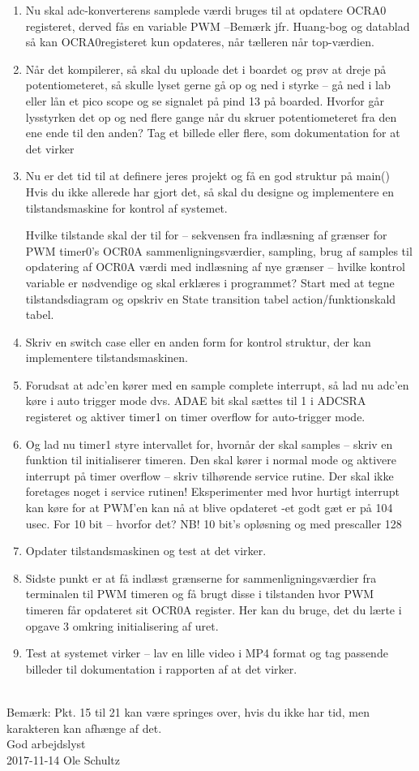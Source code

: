 \documentclass[a4paper,11pt]{article}
\theoremstyle{mytheor}
\begin{document}
\begin{enumerate}
\item	Nu skal adc-konverterens samplede værdi bruges til at opdatere OCRA0 registeret, derved fås en variable PWM –Bemærk jfr. Huang-bog og datablad så kan OCRA0registeret kun opdateres, når tælleren når top-værdien. 
\item 	Når det kompilerer, så skal du uploade det i boardet og prøv at dreje på potentiometeret, så skulle lyset gerne gå op og ned i styrke – gå ned i lab eller lån et pico scope og se signalet på pind 13 på boarded. Hvorfor går lysstyrken det op og ned flere gange når du skruer potentiometeret fra den ene ende til den anden? Tag et billede eller flere, som dokumentation for at det virker

\item Nu er det tid til at definere jeres projekt og få en god struktur på main()
Hvis du ikke allerede har gjort det, så skal du designe og implementere en tilstandsmaskine for kontrol af systemet. \par Hvilke tilstande skal der til for – sekvensen fra indlæsning af grænser for PWM timer0’s 
OCR0A sammenligningsværdier, sampling, brug af samples til opdatering af OCR0A værdi med indlæsning af nye grænser – hvilke kontrol variable er nødvendige og skal erklæres i programmet? Start med at tegne tilstandsdiagram og opskriv en State transition tabel action/funktionskald tabel. 
\item 	Skriv en switch case eller en anden form for kontrol struktur, der kan implementere tilstandsmaskinen. 

\item 	Forudsat at adc’en kører med en sample complete interrupt, så lad nu adc’en køre i auto trigger mode dvs. ADAE bit skal sættes til 1 i ADCSRA registeret og aktiver timer1 on timer overflow for auto-trigger mode. 

\item 	Og lad nu timer1 styre intervallet for, hvornår der skal samples – skriv en funktion til initialiserer timeren. Den skal kører i normal mode og aktivere interrupt på timer overflow – skriv tilhørende service rutine. Der skal ikke foretages noget i service rutinen! Eksperimenter med hvor hurtigt interrupt kan køre for at PWM’en kan nå at blive opdateret -et godt gæt er på 104 usec. For 10 bit – hvorfor det? NB! 10 bit’s opløsning og med prescaller 128 

\item 	Opdater tilstandsmaskinen og test at det virker. 

\item 	Sidste punkt er at få indlæst grænserne for sammenligningsværdier fra terminalen til PWM timeren og få brugt disse i tilstanden hvor PWM timeren får opdateret sit OCR0A register. Her kan du bruge, det du lærte i opgave 3 omkring initialisering af uret. 

\item Test at systemet virker – lav en lille video i MP4 format og tag passende billeder til dokumentation i rapporten af at det virker. 
\end{enumerate}\\

Bemærk: Pkt. 15 til 21 kan være springes over, hvis du ikke har tid, men karakteren kan afhænge af det.\\




God arbejdslyst \\

2017-11-14 Ole Schultz
\end{document}
